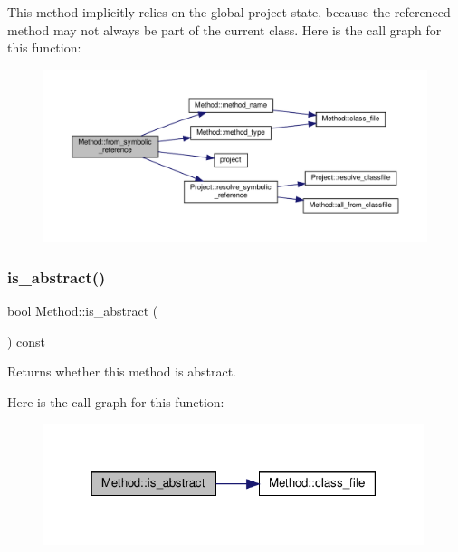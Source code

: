 This method implicitly relies on the global project state, because the referenced method may not always be part of the current class. Here is the call graph for this function\+:
\nopagebreak
\begin{figure}[H]
\begin{center}
\leavevmode
\includegraphics[width=350pt]{classMethod_adddc54ce699dfb1ba305595507085a29_cgraph}
\end{center}
\end{figure}
\mbox{\label{classMethod_a6dfb75c6faf8961c6e04a86eca6e97e8}} 
\subsubsection{\texorpdfstring{is\+\_\+abstract()}{is\_abstract()}}
{\footnotesize\ttfamily bool Method\+::is\+\_\+abstract (\begin{DoxyParamCaption}{ }\end{DoxyParamCaption}) const}



Returns whether this method is abstract. 

Here is the call graph for this function\+:
\nopagebreak
\begin{figure}[H]
\begin{center}
\leavevmode
\includegraphics[width=315pt]{classMethod_a6dfb75c6faf8961c6e04a86eca6e97e8_cgraph}
\end{center}
\end{figure}
\mbox{\label{classMethod_a74801df628f1be6e2c616cf5feb328b1}} 
